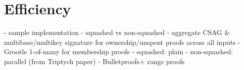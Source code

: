 \section{Efficiency}
\label{sec:efficiency}

- sample implementation
    - squashed vs non-squashed
    - aggregate CSAG \& multibase/multikey signature for ownership/unspent proofs across all inputs
    - Grootle 1-of-many for membership proofs
        - squashed: plain
        - non-squashed: parallel (from Triptych paper)
    - Bulletproofs+ range proofs
